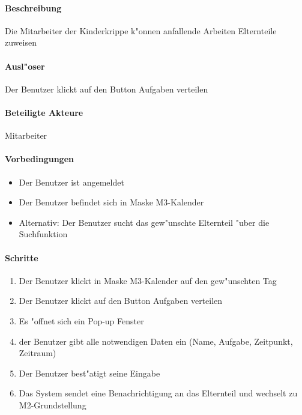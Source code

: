  \paragraph{Beschreibung}
  Die Mitarbeiter der Kinderkrippe k"onnen anfallende Arbeiten Elternteile zuweisen
  \paragraph{Ausl"oser}
  Der Benutzer klickt auf den Button \dq Aufgaben verteilen\dq
  \paragraph{Beteiligte Akteure}   \leavevmode \newline
    Mitarbeiter
  \paragraph{Vorbedingungen}
  \begin{itemize}
   \item Der Benutzer ist angemeldet
   \item Der Benutzer befindet sich in Maske M3-Kalender
   \item Alternativ: Der Benutzer sucht das gew"unschte Elternteil "uber die Suchfunktion
  \end{itemize}

  \paragraph{Schritte}
  \begin{enumerate}
  \item Der Benutzer klickt in Maske M3-Kalender auf den gew"unschten Tag
  \item Der Benutzer klickt auf den Button \dq Aufgaben verteilen\dq
  \item Es "offnet sich ein Pop-up Fenster
  \item der Benutzer gibt alle notwendigen Daten ein (Name, Aufgabe, Zeitpunkt, Zeitraum)
  \item Der Benutzer best"atigt seine Eingabe
  \item Das System sendet eine Benachrichtigung an das Elternteil und wechselt zu M2-Grundstellung
  \end{enumerate}
  
